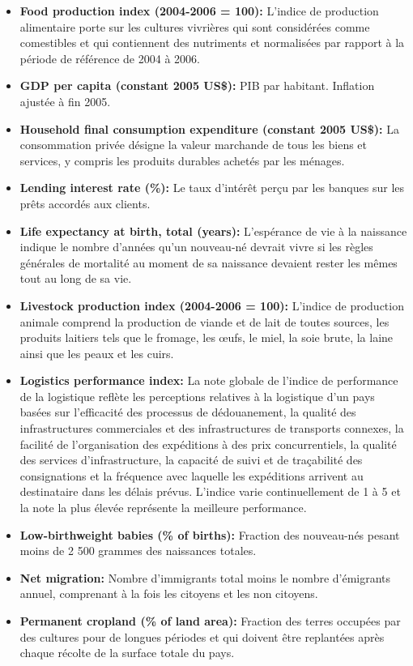 \begin{itemize}
		\item \textbf{ Food production index (2004-2006 = 100):} L'indice de production alimentaire porte sur les cultures vivrières qui sont considérées comme comestibles et qui contiennent des nutriments et normalisées par rapport à la période de référence de 2004 à 2006.
		\item \textbf{ GDP per capita (constant 2005 US\$):} PIB par habitant. Inflation ajustée à fin 2005.
		\item \textbf{ Household final consumption expenditure (constant 2005 US\$):}  La consommation privée désigne la valeur marchande de tous les biens et services, y compris les produits durables achetés par les ménages.
		\item \textbf{ Lending interest rate (\%):} Le taux d'intérêt perçu par les banques sur les prêts accordés aux clients.	
		\item \textbf{ Life expectancy at birth, total (years):} L'espérance de vie à la naissance indique le nombre d'années qu'un nouveau-né devrait vivre si les règles générales de mortalité au moment de sa naissance devaient rester les mêmes tout au long de sa vie.
		\item \textbf{ Livestock production index (2004-2006 = 100):} L'indice de production animale comprend la production de viande et de lait de toutes sources, les produits laitiers tels que le fromage, les œufs, le miel, la soie brute, la laine ainsi que les peaux et les cuirs.
		\item \textbf{ Logistics performance index:} La note globale de l'indice de performance de la logistique reflète les perceptions relatives à la logistique d'un pays basées sur l'efficacité des processus de dédouanement, la qualité des infrastructures commerciales et des infrastructures de transports connexes, la facilité de l'organisation des expéditions à des prix concurrentiels, la qualité des services d'infrastructure, la capacité de suivi et de traçabilité des consignations et la fréquence avec laquelle les expéditions arrivent au destinataire dans les délais prévus. L'indice varie continuellement de 1 à 5 et la note la plus élevée représente la meilleure performance.
		\item \textbf{ Low-birthweight babies (\% of births):} Fraction des nouveau-nés pesant moins de 2 500 grammes des naissances totales.
		\item \textbf{ Net migration:} Nombre d'immigrants total moins le nombre d'émigrants annuel, comprenant à la fois les citoyens et les non citoyens.
		\item \textbf{ Permanent cropland (\% of land area):} Fraction des terres occupées par des cultures pour de longues périodes et qui doivent être replantées après chaque récolte de la surface totale du pays.

\end{itemize}
